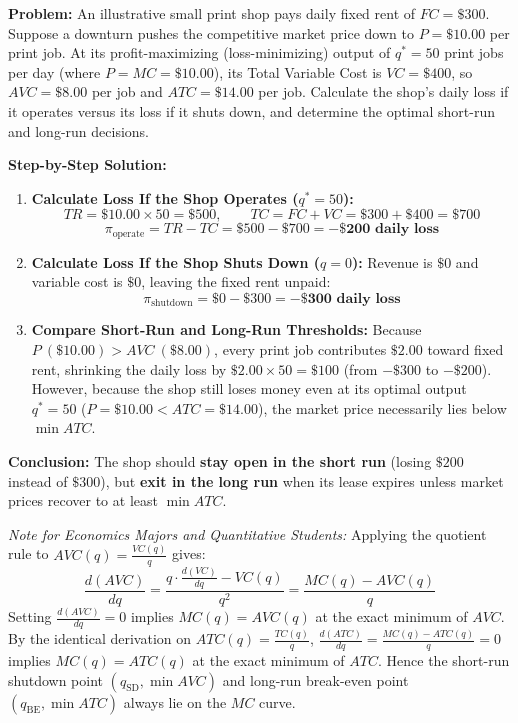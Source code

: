 \documentclass[11pt,letterpaper]{article}
\begin{document}
\begin{tcolorbox}[colback=LightSlate,colframe=SlateBlue,title=\textbf{Work It Out: Short-Run Shutdown vs.\ Long-Run Exit for a Print Shop}]
\noindent\textbf{Problem:} An illustrative small print shop pays daily fixed rent of $FC = \$300$. Suppose a downturn pushes the competitive market price down to $P = \$10.00$ per print job. At its profit-maximizing (loss-minimizing) output of $q^* = 50$ print jobs per day (where $P = MC = \$10.00$), its Total Variable Cost is $VC = \$400$, so $AVC = \$8.00$ per job and $ATC = \$14.00$ per job. Calculate the shop's daily loss if it operates versus its loss if it shuts down, and determine the optimal short-run and long-run decisions.

\medskip
\noindent\textbf{Step-by-Step Solution:}
\begin{enumerate}
    \item \textbf{Calculate Loss If the Shop Operates ($q^* = 50$):}
    \[
    TR = \$10.00 \times 50 = \$500, \qquad TC = FC + VC = \$300 + \$400 = \$700
    \]
    \[
    \pi_{\text{operate}} = TR - TC = \$500 - \$700 = \mathbf{-\$200\text{ daily loss}}
    \]

    \item \textbf{Calculate Loss If the Shop Shuts Down ($q = 0$):}
    Revenue is $\$0$ and variable cost is $\$0$, leaving the fixed rent unpaid:
    \[
    \pi_{\text{shutdown}} = \$0 - \$300 = \mathbf{-\$300\text{ daily loss}}
    \]

    \item \textbf{Compare Short-Run and Long-Run Thresholds:}
    Because $P\ (\$10.00) > AVC\ (\$8.00)$, every print job contributes $\$2.00$ toward fixed rent, shrinking the daily loss by $\$2.00 \times 50 = \$100$ (from $-\$300$ to $-\$200$). However, because the shop still loses money even at its optimal output $q^* = 50$ ($P = \$10.00 < ATC = \$14.00$), the market price necessarily lies below $\min ATC$.
\end{enumerate}
\textbf{Conclusion:} The shop should \textbf{stay open in the short run} (losing $\$200$ instead of $\$300$), but \textbf{exit in the long run} when its lease expires unless market prices recover to at least $\min ATC$.
\end{tcolorbox}

\begin{tcolorbox}[colback=LightSlate,colframe=CourseBlue,title=\textbf{Optional Advanced Section: Why $MC$ Cuts $AVC$ and $ATC$ at Their Minima}]
\small
\emph{Note for Economics Majors and Quantitative Students:}
Applying the quotient rule to $AVC(q) = \frac{VC(q)}{q}$ gives:
\[
\frac{d(AVC)}{dq} = \frac{q \cdot \frac{d(VC)}{dq} - VC(q)}{q^2} = \frac{MC(q) - AVC(q)}{q}
\]
Setting $\frac{d(AVC)}{dq} = 0$ implies $MC(q) = AVC(q)$ at the exact minimum of $AVC$. By the identical derivation on $ATC(q) = \frac{TC(q)}{q}$, $\frac{d(ATC)}{dq} = \frac{MC(q) - ATC(q)}{q} = 0$ implies $MC(q) = ATC(q)$ at the exact minimum of $ATC$. Hence the short-run shutdown point $(q_{\text{SD}}, \min AVC)$ and long-run break-even point $(q_{\text{BE}}, \min ATC)$ always lie on the $MC$ curve.
\end{tcolorbox}
\end{document}
